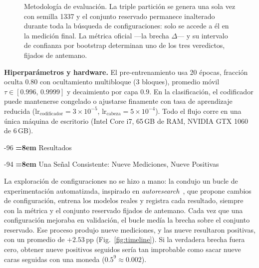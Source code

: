 \documentclass[runningheads]{llncs}
\makeatletter
\renewcommand\section{\@startsection{section}{1}{\z@}%
   {-9\p@ \@plus -2\p@ \@minus -2\p@}{6\p@ \@plus 2\p@ \@minus 2\p@}%
   {\normalfont\large\bfseries\boldmath\rightskip=\z@ \@plus 8em\pretolerance=10000 }}
\renewcommand\subsection{\@startsection{subsection}{2}{\z@}%
   {-9\p@ \@plus -2\p@ \@minus -2\p@}{4\p@ \@plus 2\p@ \@minus 2\p@}%
   {\normalfont\normalsize\bfseries\boldmath\rightskip=\z@ \@plus 8em\pretolerance=10000 }}
\makeatother
\begin{document}
\begin{figure}[t]
{}
\caption{Metodología de evaluación. La triple partición se genera una sola vez
con semilla 1337 y el conjunto reservado permanece inalterado durante toda la
búsqueda de configuraciones: solo se accede a él en la medición final. La
métrica oficial ---la brecha $\Delta$--- y su intervalo de confianza por
bootstrap determinan uno de los tres veredictos, fijados de antemano.}
\label{fig:eval}
\end{figure}

\textbf{Hiperparámetros y hardware.} El pre-entrenamiento usa 20 épocas,
fracción oculta $0.80$ con ocultamiento multibloque (3 bloques), promedio móvil
$\tau \in [0.996,\,0.9999]$ y decaimiento por capa $0.9$. En la clasificación,
el codificador puede mantenerse congelado o ajustarse finamente con tasa de
aprendizaje reducida ($\text{lr}_{\text{codificador}} = 3{\times}10^{-5}$,
$\text{lr}_{\text{cabeza}} = 5{\times}10^{-4}$). Todo el flujo corre en una única máquina de
escritorio (Intel Core i7, 65\,GB de RAM, NVIDIA GTX 1060 de 6\,GB).

\section{Resultados}

\subsection{Una Señal Consistente: Nueve Mediciones, Nueve Positivas}
\label{sec:phase4}

La exploración de configuraciones no se hizo a mano: la condujo un bucle de
experimentación automatizada, inspirado en
\emph{autoresearch}~\cite{karpathy2025autoresearch}, que propone cambios de
configuración, entrena los modelos reales y registra cada resultado, siempre
con la métrica y el conjunto reservado fijados de antemano. Cada vez que una
configuración mejoraba en validación, el bucle medía la brecha sobre el
conjunto reservado. Ese proceso produjo nueve mediciones, y las nueve
resultaron positivas, con un promedio de $+2.53$\,pp
(Fig.~\ref{fig:timeline}). Si la verdadera brecha fuera cero, obtener nueve
positivos seguidos sería tan improbable como sacar nueve caras seguidas con
una moneda ($0.5^9 \approx 0.002$).
\end{document}
